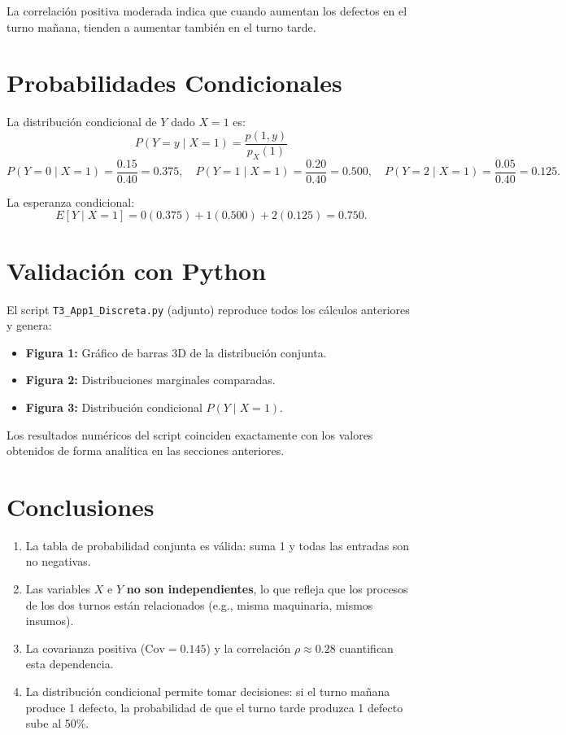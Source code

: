 \documentclass[12pt,a4paper]{article}
\begin{document}
La correlación positiva moderada indica que cuando aumentan los defectos en
el turno mañana, tienden a aumentar también en el turno tarde.

\section{Probabilidades Condicionales}

La distribución condicional de $Y$ dado $X=1$ es:
\[
  P(Y=y \mid X=1) = \frac{p(1,y)}{p_X(1)}
\]
\[
  P(Y=0\mid X=1)=\frac{0.15}{0.40}=0.375, \quad
  P(Y=1\mid X=1)=\frac{0.20}{0.40}=0.500, \quad
  P(Y=2\mid X=1)=\frac{0.05}{0.40}=0.125.
\]

La esperanza condicional:
\[
  E[Y\mid X=1] = 0(0.375)+1(0.500)+2(0.125) = 0.750.
\]

\section{Validación con Python}

El script \texttt{T3\_App1\_Discreta.py} (adjunto) reproduce todos los
cálculos anteriores y genera:

\begin{itemize}
  \item \textbf{Figura 1:} Gráfico de barras 3D de la distribución conjunta.
  \item \textbf{Figura 2:} Distribuciones marginales comparadas.
  \item \textbf{Figura 3:} Distribución condicional $P(Y\mid X=1)$.
\end{itemize}

Los resultados numéricos del script coinciden exactamente con los valores
obtenidos de forma analítica en las secciones anteriores.

\section{Conclusiones}

\begin{enumerate}
  \item La tabla de probabilidad conjunta es válida: suma 1 y todas las
        entradas son no negativas.
  \item Las variables $X$ e $Y$ \textbf{no son independientes}, lo que
        refleja que los procesos de los dos turnos están relacionados
        (e.g., misma maquinaria, mismos insumos).
  \item La covarianza positiva ($\text{Cov}=0.145$) y la correlación
        $\rho\approx 0.28$ cuantifican esta dependencia.
  \item La distribución condicional permite tomar decisiones: si el turno
        mañana produce 1 defecto, la probabilidad de que el turno tarde
        produzca 1 defecto sube al 50\%.
\end{enumerate}
\end{document}
